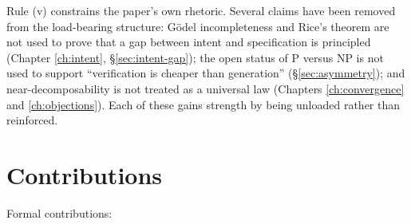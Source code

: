 Rule (v) constrains the paper's own rhetoric. Several claims have been removed from the
load-bearing structure: G\"odel incompleteness and Rice's theorem are not used to prove
that a gap between intent and specification is principled
(Chapter \ref{ch:intent}, \S\ref{sec:intent-gap}); the open status of $\mathrm{P}$ versus
$\mathrm{NP}$ is not used to support ``verification is cheaper than generation''
(\S\ref{sec:asymmetry}); and near-decomposability is not treated as a universal law
(Chapters \ref{ch:convergence} and \ref{ch:objections}). Each of these gains strength by
being unloaded rather than reinforced.

\section{Contributions}

Formal contributions:

